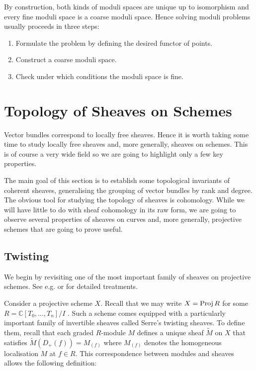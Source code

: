 \documentclass[12pt]{ociamthesis}  %
\begin{document}
By construction, both kinds of moduli spaces are unique up to
isomorphism and every fine moduli space is a coarse moduli
space. Hence solving moduli problems usually proceeds in
three steps:

\begin{enumerate}
  \item Formulate the problem by defining the desired functor of
    points.
  \item Construct a coarse moduli space.
  \item Check under which conditions the moduli space is fine.
\end{enumerate}

\section{Topology of Sheaves on Schemes}

Vector bundles correspond to locally free sheaves. Hence it is worth
taking some time to study locally free sheaves and, more generally,
sheaves on schemes. This is of course a very wide field
so we are going to highlight only a few key properties.

The main goal of this section is to establish some topological
invariants of coherent sheaves, generalising the grouping of
vector bundles by rank and degree. The obvious tool for studying
the topology of sheaves is cohomology. While we will have little
to do with sheaf cohomology in its raw form, we are going to
observe several properties of sheaves on curves and, more generally,
projective schemes that are going to prove useful.

\subsection{Twisting}

We begin by revisiting one of the most important family of sheaves
on projective schemes. See e.g. \cite{gortz2010} or
\cite{hartshorne1977} for detailed treatments.

Consider a projective scheme $X$. Recall that we may write
$X=\operatorname{Proj} R$ for some $R=\mathbb{C}[T_0,\ldots,T_n]/I$ \cite[II Corollary 5.16]{hartshorne1977}. Such a scheme comes
equipped with a particularly important family of invertible sheaves
called Serre's twisting sheaves. To define them, recall that each
graded $R$-module $M$ defines a unique sheaf $\tilde M$ on $X$
that satisfies $\tilde M (D_+(f)) = M_{(f)}$ where $M_{(f)}$
denotes the homogeneous localisation $M$ at $f\in R$. This
correspondence between modules and sheaves allows the following
definition:
\end{document}
